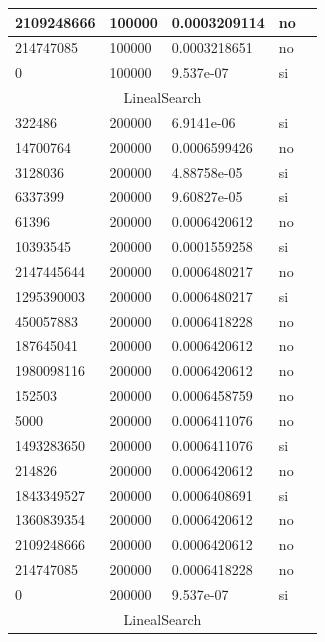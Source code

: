 \documentclass[12pt, fleqn]{article}                             %
\theoremstyle{break}                                            %
\begin{document}
\begin{longtable}{|m{5em}|m{5em}|m{10em}|m{5em}|@{}m{0pt}@{}}
            2109248666& 100000  & 0.0003209114 & no &\\[1em]    \hline
            214747085& 100000  & 0.0003218651 & no &\\[1em]    \hline
            0& 100000  & 9.537e-07 & si &\\[1em]    \hline
            \multicolumn{5}{|c|}{LinealSearch}   \\          \hline
            322486& 200000  & 6.9141e-06 & si &\\[1em]    \hline
            14700764& 200000  & 0.0006599426 & no &\\[1em]    \hline
            3128036& 200000  & 4.88758e-05 & si &\\[1em]    \hline
            6337399& 200000  & 9.60827e-05 & si &\\[1em]    \hline
            61396& 200000  & 0.0006420612 & no &\\[1em]    \hline
            10393545& 200000  & 0.0001559258 & si &\\[1em]    \hline
            2147445644& 200000  & 0.0006480217 & no &\\[1em]    \hline
            1295390003& 200000  & 0.0006480217 & si &\\[1em]    \hline
            450057883& 200000  & 0.0006418228 & no &\\[1em]    \hline
            187645041& 200000  & 0.0006420612 & no &\\[1em]    \hline
            1980098116& 200000  & 0.0006420612 & no &\\[1em]    \hline
            152503& 200000  & 0.0006458759 & no &\\[1em]    \hline
            5000& 200000  & 0.0006411076 & no &\\[1em]    \hline
            1493283650& 200000  & 0.0006411076 & si &\\[1em]    \hline
            214826& 200000  & 0.0006420612 & no &\\[1em]    \hline
            1843349527& 200000  & 0.0006408691 & si &\\[1em]    \hline
            1360839354& 200000  & 0.0006420612 & no &\\[1em]    \hline
            2109248666& 200000  & 0.0006420612 & no &\\[1em]    \hline
            214747085& 200000  & 0.0006418228 & no &\\[1em]    \hline
            0& 200000  & 9.537e-07 & si &\\[1em]    \hline
            \multicolumn{5}{|c|}{LinealSearch}   \\          \hline

\end{longtable}
\end{document}

